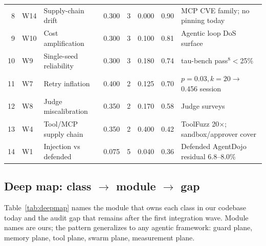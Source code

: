 \begin{longtable}{r L{0.8cm} L{2.7cm} c c c c L{2.9cm}}
8 & W14 & Supply-chain drift & 0.300 & 3 & 0.000 & 0.90 & MCP CVE family; no pinning today \cite{ox-mcp-family} \\
9 & W10 & Cost amplification & 0.300 & 3 & 0.100 & 0.81 & Agentic loop DoS surface \\
10 & W9 & Single-seed reliability & 0.300 & 3 & 0.180 & 0.74 & tau-bench pass$^8$$<$25\% \cite{taubench} \\
11 & W7 & Retry inflation & 0.400 & 2 & 0.125 & 0.70 & $p{=}0.03,k{=}20 \to$ 0.456 session \cite{pair} \\
12 & W8 & Judge miscalibration & 0.350 & 2 & 0.170 & 0.58 & Judge surveys \cite{judgesurvey,judgecalib} \\
13 & W4 & Tool/MCP supply chain & 0.350 & 2 & 0.400 & 0.42 & ToolFuzz 20$\times$; sandbox/approver cover \cite{toolfuzz} \\
14 & W1 & Injection vs defended & 0.075 & 5 & 0.040 & 0.36 & Defended AgentDojo residual 6.8--8.0\% \cite{camel,agentdojo} \\
\end{longtable}

\subsection{Deep map: class $\to$ module $\to$ gap}\label{sec:deepmap}

Table~\ref{tab:deepmap} names the module that owns each class in our codebase
today and the audit gap that remains after the first integration wave. Module
names are ours; the pattern generalizes to any agentic framework: guard plane,
memory plane, tool plane, swarm plane, measurement plane.

